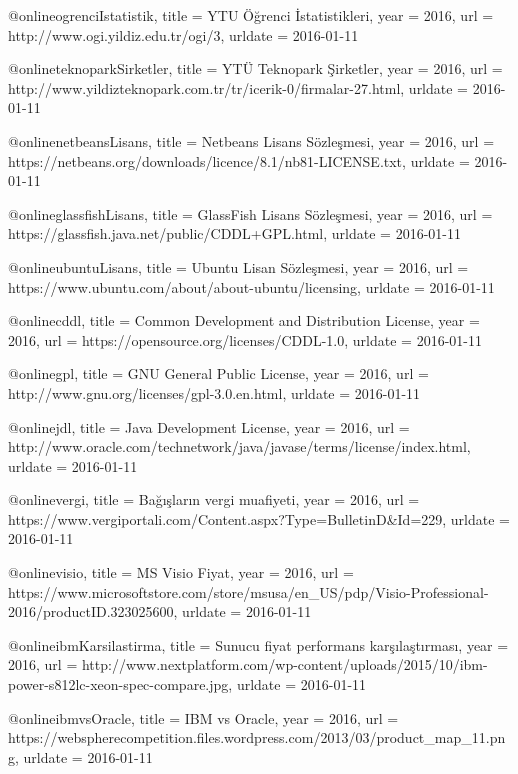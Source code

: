 @online{ogrenciIstatistik,
    title = {YTU Öğrenci İstatistikleri},
    year = 2016,
    url = {http://www.ogi.yildiz.edu.tr/ogi/3},
    urldate = {2016-01-11}
}

@online{teknoparkSirketler,
    title = {YTÜ Teknopark Şirketler},
    year = 2016,
    url = {http://www.yildizteknopark.com.tr/tr/icerik-0/firmalar-27.html},
    urldate = {2016-01-11}
}

@online{netbeansLisans,
    title = {Netbeans Lisans Sözleşmesi},
    year = 2016,
    url = {https://netbeans.org/downloads/licence/8.1/nb81-LICENSE.txt},
    urldate = {2016-01-11}
}

@online{glassfishLisans,
    title = {GlassFish Lisans Sözleşmesi},
    year = 2016,
    url = {https://glassfish.java.net/public/CDDL+GPL.html},
    urldate = {2016-01-11}
}

@online{ubuntuLisans,
    title = {Ubuntu Lisan Sözleşmesi},
    year = 2016,
    url = {https://www.ubuntu.com/about/about-ubuntu/licensing},
    urldate = {2016-01-11}
}

@online{cddl,
    title = {Common Development and Distribution License},
    year = 2016,
    url = {https://opensource.org/licenses/CDDL-1.0},
    urldate = {2016-01-11}
}

@online{gpl,
    title = {GNU General Public License},
    year = 2016,
    url = {http://www.gnu.org/licenses/gpl-3.0.en.html},
    urldate = {2016-01-11}
}

@online{jdl,
    title = {Java Development License},
    year = 2016,
    url = {http://www.oracle.com/technetwork/java/javase/terms/license/index.html},
    urldate = {2016-01-11}
}

@online{vergi,
    title = {Bağışların vergi muafiyeti},
    year = 2016,
    url = {https://www.vergiportali.com/Content.aspx?Type=BulletinD&Id=229},
    urldate = {2016-01-11}
}

@online{visio,
    title = {MS Visio Fiyat},
    year = 2016,
    url = {https://www.microsoftstore.com/store/msusa/en_US/pdp/Visio-Professional-2016/productID.323025600},
    urldate = {2016-01-11}
}

@online{ibmKarsilastirma,
    title = {Sunucu fiyat performans karşılaştırması},
    year = 2016,
    url = {http://www.nextplatform.com/wp-content/uploads/2015/10/ibm-power-s812lc-xeon-spec-compare.jpg},
    urldate = {2016-01-11}
}

@online{ibmvsOracle,
    title = {IBM vs Oracle},
    year = 2016,
    url = {https://webspherecompetition.files.wordpress.com/2013/03/product_map_11.png},
    urldate = {2016-01-11}
}


